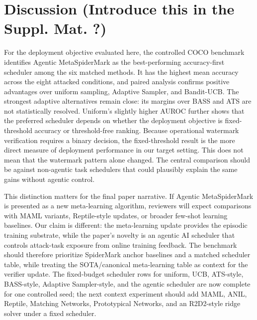 \section{Discussion (Introduce this in the Suppl. Mat. ?)}
\label{sec:discussion}

For the deployment objective evaluated here, the controlled COCO benchmark identifies Agentic MetaSpiderMark as the best-performing accuracy-first scheduler among the six matched methods.
It has the highest mean accuracy across the eight attacked conditions, and paired analysis confirms positive advantages over uniform sampling, Adaptive Sampler, and Bandit-UCB.
The strongest adaptive alternatives remain close: its margins over BASS and ATS are not statistically resolved.
Uniform's slightly higher AUROC further shows that the preferred scheduler depends on whether the deployment objective is fixed-threshold accuracy or threshold-free ranking.
Because operational watermark verification requires a binary decision, the fixed-threshold result is the more direct measure of deployment performance in our target setting.
This does not mean that the watermark pattern alone changed.
The central comparison should be against non-agentic task schedulers that could plausibly explain the same gains without agentic control.

This distinction matters for the final paper narrative.
If Agentic MetaSpiderMark is presented as a new meta-learning algorithm, reviewers will expect comparisons with MAML variants, Reptile-style updates, or broader few-shot learning baselines.
Our claim is different: the meta-learning update provides the episodic training substrate, while the paper's novelty is an agentic AI scheduler that controls attack-task exposure from online training feedback.
The benchmark should therefore prioritize SpiderMark anchor baselines and a matched scheduler table, while treating the SOTA/canonical meta-learning table as context for the verifier update.
The fixed-budget scheduler rows for uniform, UCB, ATS-style, BASS-style, Adaptive Sampler-style, and the agentic scheduler are now complete for one controlled seed; the next context experiment should add MAML, ANIL, Reptile, Matching Networks, Prototypical Networks, and an R2D2-style ridge solver under a fixed scheduler.

